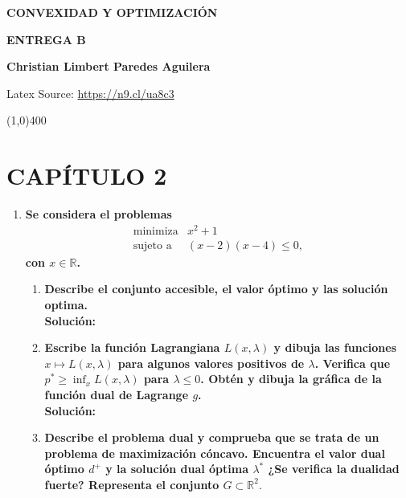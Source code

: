 \begin{center}
\textbf{CONVEXIDAD Y OPTIMIZACIÓN}

\textbf{\Large ENTREGA B}

\textbf{ \textbf{Christian Limbert Paredes Aguilera}}
\end{center}
\begin{center}
    Latex Source: \url{https://n9.cl/ua8c3}
\end{center}

\line(1,0){400}


\section*{CAPÍTULO 2}

\begin{enumerate}

    \item \textbf{\boldmath Se considera el problemas
    $$
    \begin{array}{ll}
	\text{minimiza} & x^2+1\\
	\text{sujeto a} & (x-2)(x-4)\leq 0,
    \end{array}
    $$
    con $x\in \mathbb{R}$.}
    \begin{enumerate}[\bfseries (a)]

	\item \textbf{\boldmath Describe el conjunto accesible, el valor óptimo y las solución optima.}\\
	

	    \textbf{Solución:}
	\item \textbf{\boldmath Escribe la función Lagrangiana $L(x,\lambda)$ y dibuja las funciones $x\mapsto L(x,\lambda)$ para algunos valores positivos de $\lambda$. Verifica que $p^*\geq \inf_xL(x,\lambda)$ para $\lambda\leq 0$. Obtén y dibuja la gráfica de la función dual de Lagrange $g$.}\\

	    \textbf{Solución:}

	\item \textbf{\boldmath Describe el problema dual y comprueba que se trata de un problema de maximización cóncavo. Encuentra el valor dual óptimo $d^+$ y la solución dual óptima $\lambda^*$ ¿Se verifica la dualidad fuerte? Representa el conjunto $G\subset \mathbb{R}^2$}.\\


\end{enumerate}
\end{enumerate}
